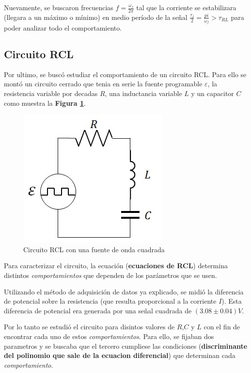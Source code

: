 \documentclass[11pt,a4paper]{article}
\begin{document}
Nuevamente, se buscaron frecuencias $f = \frac{\omega_f}{2\pi}$ tal que la corriente se estabilizara (llegara a un máximo o mínimo) en medio período de la señal $\frac{\tau_f}{2} = \frac{pi}{\omega_f} > \tau_{RL}$ para poder analizar todo el comportamiento.

\subsection{Circuito RCL}

Por ultimo, se buscó estudiar el comportamiento de un circuito RCL. Para ello se montó un circuito cerrado que tenia en serie la fuente programable $\varepsilon$, la resistencia variable por decadas $R$, una inductancia variable $L$ y un capacitor $C$ como muestra la \textbf{Figura \ref{fig:RCL}}.  

\begin{figure}[h]
\centering
\includegraphics[scale=0.7]{Circuito-RCL}
  \caption{Circuito RCL con una fuente de onda cuadrada}
  \label{fig:RCL}
\end{figure}

Para caracterizar el circuito, la ecuación (\textbf{ecuaciones de RCL}) determina distintos \textit{comportamientos} que dependen de los parámetros que se usen.

Utilizando el método de adquisición de datos ya explicado, se midió la diferencia de potencial sobre la resistencia (que resulta proporcional a la corriente $I$). Esta diferencia de potencial era generada por una señal cuadrada de $(3.08 \pm 0.04)V$.

Por lo tanto se estudió el circuito para disintos valores de $R$,$C$ y $L$ con el fin de encontrar cada uno de estos \textit{comportamientos}. Para ello, se fijaban dos parametros y se buscaba que el tercero cumpliese las condiciones (\textbf{discriminante del polinomio que sale de la ecuacion diferencial}) que determinan cada \textit{comportamiento}.
\end{document}
